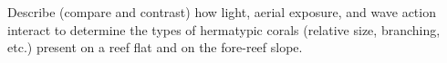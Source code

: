 \documentclass[11pt, addpoints]{exam}
\newcommand*\AnswerBox[2]{%
    \parbox[t][#1]{0.92\textwidth}{%
    \begin{solution}#2\end{solution}}
    \vspace{\stretch{1}}
}
\begin{document}
\begin{questions}
%

%

\newpage


\question[15]
Describe (compare and contrast) how light, aerial exposure, and wave action interact to determine the types of hermatypic corals (relative size, branching, etc.) present on a reef flat and on the fore-reef slope. 

%




\end{questions}
\end{document}
